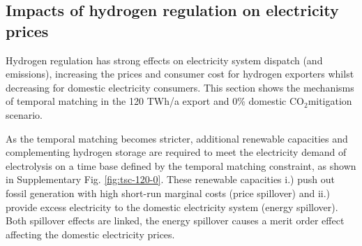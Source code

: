 \documentclass[5p,numafflabel]{elsarticle}
\newcommand{\co}{\ce{CO2}~}
\def\co{CO${}_2${\:}}
\begin{document}





\subsection*{Impacts of hydrogen regulation on electricity prices}
\label{subsec:benefits_rule}

Hydrogen regulation has strong effects on electricity system dispatch (and emissions), increasing the prices and consumer cost for hydrogen exporters whilst decreasing for domestic electricity consumers. This section shows the mechanisms of temporal matching in the 120 TWh/a export and 0\% domestic \co mitigation scenario.

As the temporal matching becomes stricter, additional renewable capacities and complementing hydrogen storage are required to meet the electricity demand of electrolysis
on a time base defined by the temporal matching constraint, as shown in Supplementary Fig. \ref{fig:tsc-120-0}. These renewable capacities i.) push out fossil generation with high short-run marginal costs (price spillover) and ii.) provide excess electricity to the domestic electricity system (energy spillover). Both spillover effects are linked, the energy spillover causes a merit order effect affecting the domestic electricity prices.
\end{document}
